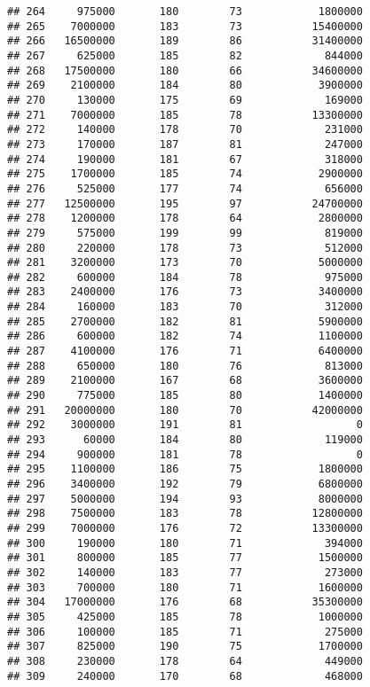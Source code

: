 \documentclass[
]{article}
\begin{document}
\begin{verbatim}
## 264     975000       180        73            1800000
## 265    7000000       183        73           15400000
## 266   16500000       189        86           31400000
## 267     625000       185        82             844000
## 268   17500000       180        66           34600000
## 269    2100000       184        80            3900000
## 270     130000       175        69             169000
## 271    7000000       185        78           13300000
## 272     140000       178        70             231000
## 273     170000       187        81             247000
## 274     190000       181        67             318000
## 275    1700000       185        74            2900000
## 276     525000       177        74             656000
## 277   12500000       195        97           24700000
## 278    1200000       178        64            2800000
## 279     575000       199        99             819000
## 280     220000       178        73             512000
## 281    3200000       173        70            5000000
## 282     600000       184        78             975000
## 283    2400000       176        73            3400000
## 284     160000       183        70             312000
## 285    2700000       182        81            5900000
## 286     600000       182        74            1100000
## 287    4100000       176        71            6400000
## 288     650000       180        76             813000
## 289    2100000       167        68            3600000
## 290     775000       185        80            1400000
## 291   20000000       180        70           42000000
## 292    3000000       191        81                  0
## 293      60000       184        80             119000
## 294     900000       181        78                  0
## 295    1100000       186        75            1800000
## 296    3400000       192        79            6800000
## 297    5000000       194        93            8000000
## 298    7500000       183        78           12800000
## 299    7000000       176        72           13300000
## 300     190000       180        71             394000
## 301     800000       185        77            1500000
## 302     140000       183        77             273000
## 303     700000       180        71            1600000
## 304   17000000       176        68           35300000
## 305     425000       185        78            1000000
## 306     100000       185        71             275000
## 307     825000       190        75            1700000
## 308     230000       178        64             449000
## 309     240000       170        68             468000

\end{verbatim}
\end{document}
